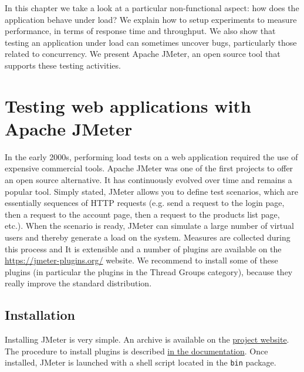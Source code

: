 
In this chapter we take a look at a particular non-functional aspect: how does the application behave under load? We explain how to setup experiments to measure performance, in terms of response time and throughput. We also show that testing an application under load can sometimes uncover bugs, particularly those related to concurrency. We present Apache JMeter, an open source tool that supports these testing activities.

\section{Testing web applications with Apache JMeter}

In the early 2000s, performing load tests on a web application required the use of expensive commercial tools. Apache JMeter was one of the first projects to offer an open source alternative. It has continuously evolved over time and remains a popular tool. Simply stated, JMeter allows you to define test scenarios, which are essentially sequences of HTTP requests (e.g. send a request to the login page, then a request to the account page, then a request to the products list page, etc.). When the scenario is ready, JMeter can simulate a large number of virtual users and thereby generate a load on the system. Measures are collected during this process and  It is extensible and a number of plugins are available on the \href{jmeter-plugins.org}{https://jmeter-plugins.org/} website. We recommend to install some of these plugins (in particular the plugins in the Thread Groups category), because they really improve the standard distribution.

\subsection{Installation}

Installing JMeter is very simple. An archive is available on the \href{https://jmeter.apache.org/download_jmeter.cgi}{project website}. The procedure to install plugins is described \href{https://jmeter-plugins.org/install/Install/}{in the documentation}. Once installed, JMeter is launched with a shell script located in the \texttt{bin} package.


